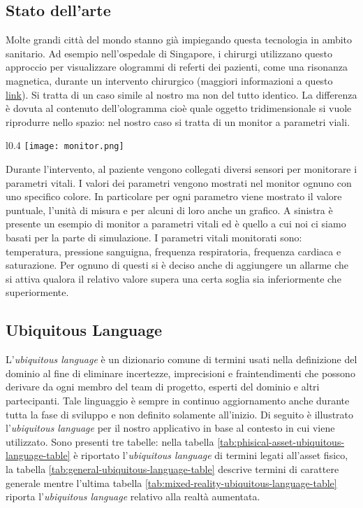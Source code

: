 \subsection{Stato dell'arte}
Molte grandi città del mondo stanno già impiegando questa tecnologia in ambito sanitario. Ad esempio nell'ospedale di Singapore, i chirurgi utilizzano questo approccio per visualizzare ologrammi di referti dei pazienti, come una risonanza magnetica, durante un intervento chirurgico (maggiori informazioni a questo \href{https://govinsider.asia/citizen-centric/how-a-singapore-hospital-uses-holograms-to-assist-surgery-nuhs-ngiam-kee-yuan/}{link}). Si tratta di un caso simile al nostro ma non del tutto identico. 
La differenza è dovuta al contenuto dell'ologramma cioè quale oggetto tridimensionale si vuole riprodurre nello spazio: nel nostro caso si tratta di un monitor a parametri viali.

\begin{wrapfigure}{l}{0.4\textwidth}
    \centering
    \texttt{[image: monitor.png]}
\end{wrapfigure}

Durante l'intervento, al paziente vengono collegati diversi sensori per monitorare i parametri vitali.
I valori dei parametri vengono mostrati nel monitor ognuno con uno specifico colore. In particolare per ogni parametro viene mostrato il valore puntuale, l'unità di misura e per alcuni di loro anche un grafico. 
A sinistra è presente un esempio di monitor a parametri vitali ed è quello a cui noi ci siamo basati per la parte di simulazione. I parametri vitali monitorati sono: temperatura, pressione sanguigna, frequenza respiratoria, frequenza cardiaca e saturazione. Per ognuno di questi si è deciso anche di aggiungere un allarme che si attiva qualora il relativo valore supera una certa soglia sia inferiormente che superiormente.

\subsection{Ubiquitous Language}
L'\textit{ubiquitous language} è un dizionario comune di termini usati nella definizione del dominio al fine di eliminare incertezze, imprecisioni e fraintendimenti che possono derivare da ogni membro del team di progetto, esperti del dominio e altri partecipanti. Tale linguaggio è sempre in continuo aggiornamento anche durante tutta la fase di sviluppo e non definito solamente all'inizio. \newline \newline Di seguito è illustrato l'\textit{ubiquitous language} per il nostro applicativo in base al contesto in cui viene utilizzato. Sono presenti tre tabelle: nella tabella \ref{tab:phisical-asset-ubiquitous-language-table} è riportato  l'\textit{ubiquitous language} di termini legati all'asset fisico, la tabella \ref{tab:general-ubiquitous-language-table} descrive termini di carattere generale mentre l'ultima tabella \ref{tab:mixed-reality-ubiquitous-language-table} riporta l'\textit{ubiquitous language} relativo alla realtà aumentata.

